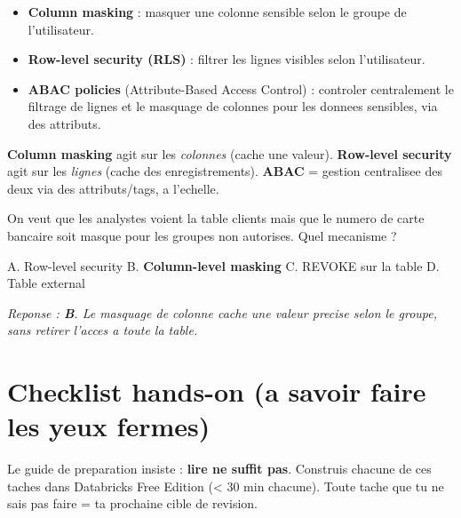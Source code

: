 \documentclass[11pt,a4paper]{article}
\begin{document}
\begin{itemize}[leftmargin=*,nosep]
  \item \textbf{Column masking} : masquer une colonne sensible selon le groupe de l'utilisateur.
  \item \textbf{Row-level security (RLS)} : filtrer les lignes visibles selon l'utilisateur.
  \item \textbf{ABAC policies} (Attribute-Based Access Control) : controler centralement le
  filtrage de lignes et le masquage de colonnes pour les donnees sensibles, via des attributs.
\end{itemize}

\begin{piege}
\textbf{Column masking} agit sur les \emph{colonnes} (cache une valeur).
\textbf{Row-level security} agit sur les \emph{lignes} (cache des enregistrements).
\textbf{ABAC} = gestion centralisee des deux via des attributs/tags, a l'echelle.
\end{piege}

\begin{qcm}
On veut que les analystes voient la table clients mais que le numero de carte bancaire soit
masque pour les groupes non autorises. Quel mecanisme ?

\smallskip
A. Row-level security \hfill
B. \textbf{Column-level masking} \hfill
C. REVOKE sur la table \hfill
D. Table external

\smallskip
\textit{Reponse : \textbf{B}. Le masquage de colonne cache une valeur precise selon le groupe,
sans retirer l'acces a toute la table.}
\end{qcm}

\section{Checklist hands-on (a savoir faire les yeux fermes)}

Le guide de preparation insiste : \textbf{lire ne suffit pas}. Construis chacune de ces taches
dans Databricks Free Edition (< 30 min chacune). Toute tache que tu ne sais pas faire = ta
prochaine cible de revision.
\end{document}

